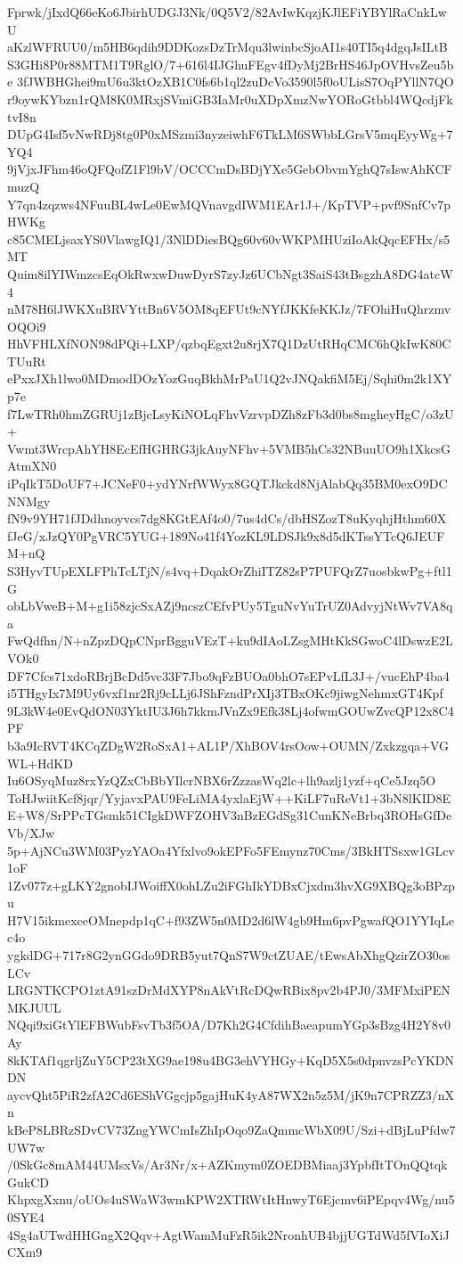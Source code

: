 Fprwk/jIxdQ66eKo6JbirhUDGJ3Nk/0Q5V2/82AvIwKqzjKJlEFiYBYlRaCnkLwU
aKzlWFRUU0/m5HB6qdih9DDKozsDzTrMqu3lwinbcSjoAI1s40TI5q4dgqJsILtB
S3GHi8P0r88MTM1T9RglO/7+616l4IJGhuFEgv4fDyMj2BrHS46JpOVHvsZeu5be
3fJWBHGhei9mU6u3ktOzXB1C0fs6b1ql2zuDcVo3590l5f0oULisS7OqPYllN7QO
r9oywKYbzn1rQM8K0MRxjSVmiGB3IaMr0uXDpXmzNwYORoGtbbl4WQcdjFktvI8n
DUpG4Isf5vNwRDj8tg0P0xMSzmi3nyzeiwhF6TkLM6SWbbLGrsV5mqEyyWg+7YQ4
9jVjxJFhm46oQFQofZ1Fl9bV/OCCCmDsBDjYXe5GebObvmYghQ7sIswAhKCFmuzQ
Y7qn4zqzws4NFuuBL4wLe0EwMQVnavgdIWM1EAr1J+/KpTVP+pvf9SnfCv7pHWKg
c85CMELjsaxYS0VlawgIQ1/3NlDDiesBQg60v60vWKPMHUziIoAkQqcEFHx/s5MT
Quim8ilYIWmzcsEqOkRwxwDuwDyrS7zyJz6UCbNgt3SaiS43tBsgzhA8DG4atcW4
nM78H6lJWKXuBRVYttBn6V5OM8qEFUt9cNYfJKKfeKKJz/7FOhiHuQhrzmvOQOi9
HhVFHLXfNON98dPQi+LXP/qzbqEgxt2u8rjX7Q1DzUtRHqCMC6hQkIwK80CTUuRt
ePxxJXh1lwo0MDmodDOzYozGuqBkhMrPaU1Q2vJNQakfiM5Ej/Sqhi0m2k1XYp7e
f7LwTRh0hmZGRUj1zBjcLsyKiNOLqFhvVzrvpDZh8zFb3d0bs8mgheyHgC/o3zU+
Vwmt3WrcpAhYH8EcEfHGHRG3jkAuyNFhv+5VMB5hCs32NBuuUO9h1XkcsGAtmXN0
iPqIkT5DoUF7+JCNeF0+ydYNrfWWyx8GQTJkckd8NjAlabQq35BM0exO9DCNNMgy
fN9v9YH71fJDdhnoyvcs7dg8KGtEAf4o0/7us4dCs/dbHSZozT8uKyqhjHthm60X
fJeG/xJzQY0PgVRC5YUG+189No41f4YozKL9LDSJk9x8d5dKTssYTcQ6JEUFM+nQ
S3HyvTUpEXLFPhTcLTjN/s4vq+DqakOrZhiITZ82sP7PUFQrZ7uosbkwPg+ftl1G
obLbVweB+M+g1i58zjcSxAZj9ncszCEfvPUy5TguNvYuTrUZ0AdvyjNtWv7VA8qa
FwQdfhn/N+nZpzDQpCNprBgguVEzT+ku9dIAoLZsgMHtKkSGwoC4lDswzE2LVOk0
DF7Cfcs71xdoRBrjBcDd5vc33F7Jbo9qFzBUOa0bhO7sEPvLfL3J+/vucEhP4ba4
i5THgyIx7M9Uy6vxf1nr2Rj9cLLj6JShFzndPrXIj3TBxOKc9jiwgNehmxGT4Kpf
9L3kW4e0EvQdON03YktIU3J6h7kkmJVnZx9Efk38Lj4ofwmGOUwZvcQP12x8C4PF
b3a9IcRVT4KCqZDgW2RoSxA1+AL1P/XhBOV4rsOow+OUMN/Zxkzgqa+VGWL+HdKD
Iu6OSyqMuz8rxYzQZxCbBbYIlcrNBX6rZzzasWq2lc+lh9azlj1yzf+qCe5Jzq5O
ToHJwiitKcf8jqr/YyjavxPAU9FeLiMA4yxlaEjW++KiLF7uReVt1+3bN8lKID8E
E+W8/SrPPcTGsmk51CIgkDWFZOHV3nBzEGdSg31CunKNeBrbq3ROHsGfDeVb/XJw
5p+AjNCu3WM03PyzYAOa4Yfxlvo9okEPFo5FEmynz70Cms/3BkHTSsxw1GLcv1oF
1Zv077z+gLKY2gnobIJWoiffX0ohLZu2iFGhIkYDBxCjxdm3hvXG9XBQg3oBPzpu
H7V15ikmexceOMnepdp1qC+f93ZW5n0MD2d6lW4gb9Hm6pvPgwafQO1YYIqLec4o
ygkdDG+717r8G2ynGGdo9DRB5yut7QnS7W9ctZUAE/tEwsAbXhgQzirZO30osLCv
LRGNTKCPO1ztA91szDrMdXYP8nAkVtRcDQwRBix8pv2b4PJ0/3MFMxiPENMKJUUL
NQqi9xiGtYlEFBWubFsvTb3f5OA/D7Kh2G4CfdihBaeapumYGp3sBzg4H2Y8v0Ay
8kKTAf1qgrljZuY5CP23tXG9ae198u4BG3ehVYHGy+KqD5X5s0dpnvzsPcYKDNDN
aycvQht5PiR2zfA2Cd6EShVGgcjp5gajHuK4yA87WX2n5z5M/jK9n7CPRZZ3/nXn
kBeP8LBRzSDvCV73ZngYWCmIsZhIpOqo9ZaQmmcWbX09U/Szi+dBjLuPfdw7UW7w
/0SkGc8mAM44UMsxVs/Ar3Nr/x+AZKmym0ZOEDBMiaaj3YpbfItTOnQQtqkGukCD
KhpxgXxnu/oUOs4uSWaW3wmKPW2XTRWtItHnwyT6Ejcmv6iPEpqv4Wg/nu50SYE4
4Sg4aUTwdHHGngX2Qqv+AgtWamMuFzR5ik2NronhUB4bjjUGTdWd5fVIoXiJCXm9
